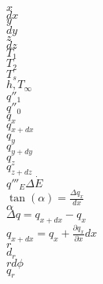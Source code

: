 
	
$x$ \\

$dx$ \\

$y$ \\

$dy$ \\

$z$	\\ 

$dz$ \\

$T_1$ \\

$T_2$ \\

$T_s$ \\

$h, T_{\infty}$ \\

$q''_{1}$ \\

$q''_{0}$ \\

$q_x$ \\

$q_{x+dx}$ \\

$q_y$ \\

$q_{y+dy}$ \\

$q_z$ \\

$q_{z+dz}$ \\

$q'''_{E}\Delta \dot{E}$ \\

$\displaystyle \tan(\alpha) = \frac{\Delta q_x}{dx}$ \\

$\alpha$ \\

$\Delta q = q_{x+dx} - q_{x}$ \\

$q_{x+dx} = q_{x} + \frac{\partial q_x}{\partial x} dx$ \\

$r$ \\

$d_r$ \\

$rd\phi$ \\

$q_r$ \\

